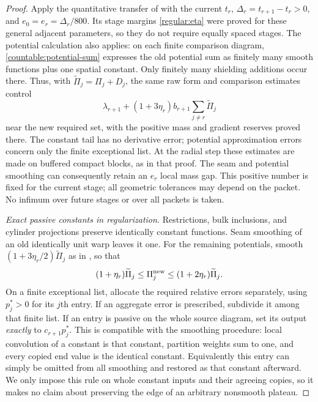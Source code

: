 \documentclass[11pt]{article}
\numberwithin{equation}{section}
\theoremstyle{definition}
\theoremstyle{remark}
\begin{document}
\begin{proof}
Apply the quantitative transfer of  with the
current $t_r$, $\Delta_r=t_{r+1}-t_r>0$, and $e_0=e_r=\Delta_r/800$.
Its stage margins \eqref{regular:eta} were proved for these general
adjacent parameters, so they do not require equally spaced stages.
The potential calculation also applies: on each finite comparison
diagram, \eqref{countable:potential-sum} expresses the old potential
sum as finitely many smooth functions plus one spatial constant.
Only finitely many shielding additions occur there. Thus, with
$\widetilde\Pi_j=\Pi_j+D_j$, the same raw form and comparison estimates
control
\begin{equation}\label{countable:raw-target}
 \lambda_{r+1}+(1+3\eta_r)b_{r+1}
                         \sum_{j\ne r}\widetilde\Pi_j
\end{equation}
near the new required set, with the positive mass and gradient reserves
proved there. The constant tail has no derivative error; potential
approximation errors concern only the finite exceptional list. At the
radial step these estimates are made on buffered compact blocks, as
in that proof.
The seam and potential smoothing can consequently retain an $e_r$
local mass gap. This positive number is fixed for the current stage;
all geometric tolerances may depend on the packet. No infimum over
future stages or over all packets is taken.

\emph{Exact passive constants in regularization.}
Restrictions, bulk inclusions, and cylinder projections preserve
identically constant functions. Seam smoothing of an old identically
unit warp leaves it one. For the remaining potentials, smooth
$(1+3\eta_r/2)\widetilde\Pi_j$ as in
, so that
\begin{equation}\label{countable:smooth-potentials}
 (1+\eta_r)\widetilde\Pi_j\le\Pi_j^{\rm new}
                     \le(1+2\eta_r)\widetilde\Pi_j.
\end{equation}
On a finite exceptional list, allocate the required relative errors
separately, using $p_j^*>0$ for its $j$th entry. If an aggregate error
is prescribed, subdivide it among that finite list. If an entry is
passive on the whole source diagram, set its output \emph{exactly} to
$c_{r+1}p_j^*$. This is compatible with the smoothing procedure:
local convolution of a constant is that constant, partition weights
sum to one, and every copied end value is the identical constant.
Equivalently this entry can simply be omitted from all smoothing and
restored as that constant afterward. We only impose this rule on
whole constant inputs and their agreeing copies, so it makes no claim
about preserving the edge of an arbitrary nonsmooth plateau.


\end{proof}
\end{document}
